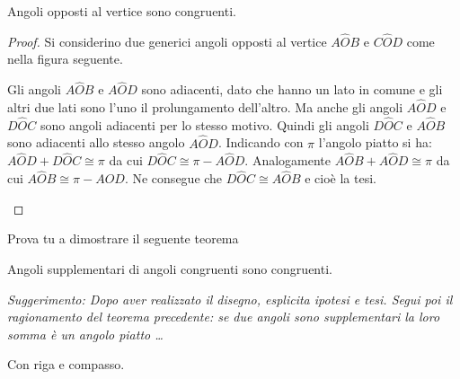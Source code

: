 \begin{teorema}
Angoli opposti al vertice sono congruenti.
\end{teorema}

\begin{proof}
Si considerino due generici angoli opposti al vertice \(A\widehat{O}B\) 
e \(C\widehat{O}D\) come nella figura seguente.

\begin{minipage}{.59\textwidth}
 Gli angoli \(A\widehat{O}B\) e \(A\widehat{O}D\) sono adiacenti, dato che 
hanno un lato in comune e gli altri due lati sono l'uno il 
prolungamento dell'altro. Ma anche gli angoli \(A\widehat{O}D\) e 
\(D\widehat{O}C\) sono angoli adiacenti per lo stesso motivo. Quindi 
gli angoli \(D\widehat{O}C\) e \(A\widehat{O}B\) sono adiacenti allo 
stesso angolo \(A\widehat{O}D\).
Indicando con \(\pi\) l'angolo piatto si ha: \(A\widehat{O}D + 
D\widehat{O}C \cong \pi\) da cui \(D\widehat{O}C\cong \pi - 
A\widehat{O}D\). Analogamente \(A\widehat{O}B+A\widehat{O}D\cong\pi\) da 
cui \(A\widehat{O}B\cong \pi-A\widehat{O}D\). Ne consegue che 
\(D\widehat{O}C\cong A\widehat{O}B\) e cioè la tesi.
\end{minipage}
\begin{minipage}{.39\textwidth}
 \begin{inaccessibleblock}
\begin{center}
 
\end{center}
\end{inaccessibleblock}
\end{minipage}
\end{proof}

Prova tu a dimostrare il seguente teorema

\begin{teorema}
Angoli supplementari di angoli congruenti sono congruenti.
\end{teorema}

\emph{Suggerimento: Dopo aver realizzato il disegno, esplicita 
ipotesi e tesi. Segui poi il ragionamento del teorema precedente: se 
due angoli sono supplementari la loro somma è un angolo piatto 
\ldots{}}

Con riga e compasso.


